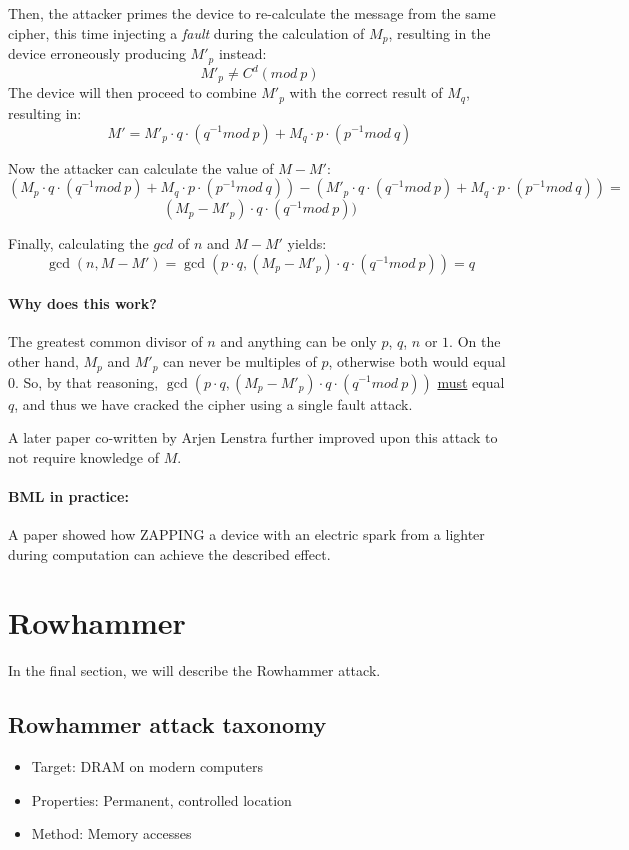 Then, the attacker primes the device to re-calculate the message from the same cipher, this time injecting a \emph{fault} during the calculation of $M_p$, resulting in the device erroneously producing $M'_p$ instead:
\[M'_p \neq C^d (mod\ p)\]
The device will then proceed to combine $M'_p$ with the correct result of $M_q$, resulting in:
\[M' =  M'_p \cdot q \cdot (q^{-1} mod\ p) + M_q \cdot p \cdot (p^{-1} mod\ q)\]

Now the attacker can calculate the value of $M - M'$:
\[
	 (M_p \cdot q \cdot (q^{-1} mod\ p) + M_q \cdot p \cdot (p^{-1} mod\ q)) - (M'_p \cdot q \cdot (q^{-1} mod\ p) + M_q \cdot p \cdot (p^{-1} mod\ q)) =
\]
\[
	(M_p - M'_p) \cdot q \cdot (q^{-1} mod\ p))
\]

Finally, calculating the $gcd$ of $n$ and $M - M'$ yields:
\[
	\gcd(n, M - M') = \gcd(p \cdot q, (M_p - M'_p) \cdot q \cdot (q^{-1} mod\ p)) = q
\]

\paragraph{Why does this work?} The greatest common divisor of $n$ and anything can be only $p$, $q$, $n$ or $1$. On the other hand, $M_p$ and $M'_p$ can never be multiples of $p$, otherwise both would equal 0. So, by that reasoning, $\gcd(p \cdot q, (M_p - M'_p) \cdot q \cdot (q^{-1} mod\ p))$ \underline{must} equal $q$, and thus we have cracked the cipher using a single fault attack.

A later paper co-written by Arjen Lenstra \cite{lenstra} further improved upon this attack to not require knowledge of $M$.

\paragraph{BML in practice:} A paper \cite{schmidt} showed how ZAPPING a device with an electric spark from a lighter during computation can achieve the described effect.

\section{Rowhammer} \label{sec:rowhammer}
In the final section, we will describe the Rowhammer attack.
\subsection{Rowhammer attack taxonomy} \label{subsec:rowhammer_attack_taxonomy}
	\begin{itemize}
		\item Target: DRAM on modern computers
		\item Properties: Permanent, controlled location
		\item Method: Memory accesses
	\end{itemize}

